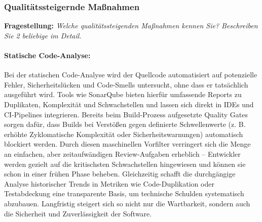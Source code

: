 

\subsubsection{Qualitätssteigernde Maßnahmen}

\textbf{Fragestellung:} \textit{Welche qualitätssteigenden Maßnahmen kennen Sie? Beschreiben Sie 2 beliebige im Detail.}    

\paragraph{Statische Code-Analyse:}
Bei der statischen Code-Analyse wird der Quellcode automatisiert auf potenzielle Fehler, Sicherheitslücken und Code-Smells untersucht, ohne dass er tatsächlich ausgeführt wird. 
Tools wie SonarQube bieten hierfür umfassende Reports zu Duplikaten, Komplexität und Schwachstellen und lassen sich direkt in IDEs und CI-Pipelines integrieren.\cite{sonarqube-docs-2023,ayewah2008using}
Bereits beim Build-Prozess aufgesetzte Quality Gates sorgen dafür, dass Builds bei Verstößen gegen definierte Schwellenwerte (z. B. erhöhte Zyklomatische Komplexität oder Sicherheitswarnungen) automatisch blockiert werden. \cite{beller2016static}
\newline
Durch diesen maschinellen Vorfilter verringert sich die Menge an einfachen, 
aber zeitaufwändigen Review-Aufgaben erheblich – Entwickler werden gezielt auf die kritischsten Schwachstellen hingewiesen und können sie schon in einer frühen Phase beheben.\cite{ayewah2008using}
Gleichzeitig schafft die durchgängige Analyse historischer Trends in Metriken wie Code-Duplikation oder Testabdeckung eine transparente Basis, um technische Schulden systematisch abzubauen. 
Langfristig steigert sich so nicht nur die Wartbarkeit, sondern auch die Sicherheit und Zuverlässigkeit der Software. \cite{sonarqube-docs-2023}
